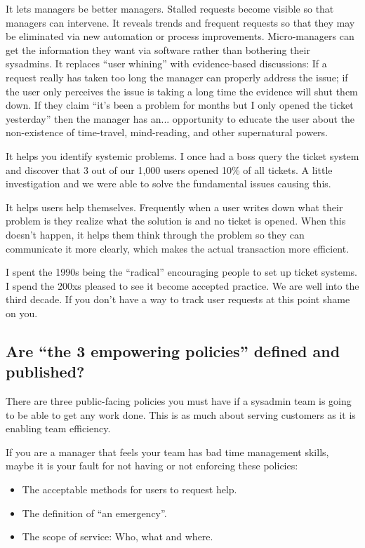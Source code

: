 \documentclass{article}
\begin{document}
It lets managers be better managers. Stalled requests become visible so that managers can intervene. It reveals trends and frequent requests so that they may be eliminated via new automation or process improvements. Micro-managers can get the information they want via software rather than bothering their sysadmins. It replaces ``user whining'' with evidence-based discussions: If a request really has taken too long the manager can properly address the issue; if the user only perceives the issue is taking a long time the evidence will shut them down. If they claim ``it's been a problem for months but I only opened the ticket yesterday'' then the manager has an... opportunity to educate the user about the non-existence of time-travel, mind-reading, and other supernatural powers.

It helps you identify systemic problems. I once had a boss query the ticket system and discover that 3 out of our 1,000 users opened 10\% of all tickets. A little investigation and we were able to solve the fundamental issues causing this.

It helps users help themselves. Frequently when a user writes down what their problem is they realize what the solution is and no ticket is opened. When this doesn't happen, it helps them think through the problem so they can communicate it more clearly, which makes the actual transaction more efficient.

I spent the 1990s being the ``radical'' encouraging people to set up ticket systems. I spend the 200xs pleased to see it become accepted practice. We are well into the third decade. If you don't have a way to track user requests at this point shame on you.

\subsection{Are ``the 3 empowering policies'' defined and published?}
There are three public-facing policies you must have if a sysadmin team is going to be able to get any work done. This is as much about serving customers as it is enabling team efficiency.

If you are a manager that feels your team has bad time management skills, maybe it is your fault for not having or not enforcing these policies:

\begin{itemize}
    \item The acceptable methods for users to request help.
    \item The definition of ``an emergency''.
    \item The scope of service: Who, what and where.
\end{itemize}
\end{document}
